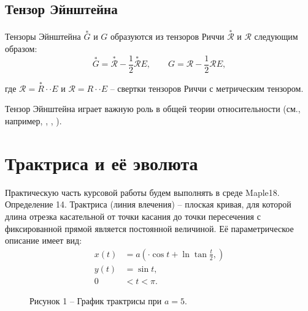 \documentclass[14pt,a4paper]{extarticle}
\begin{document}
\subsection{Тензор Эйнштейна}
Тензоры Эйнштейна $\overset{*}{G}$ и $G$ образуются из тензоров Риччи $\overset{*}{\mathcal{R}}$ и $\mathcal{R}$ следующим образом:
\begin{equation}\label{eq39}
	\overset{*}{G} = \overset{*}{\mathcal{R}} - \frac{1}{2}\overset{*}{\mathcal{R}}E, \qquad G = \mathcal{R} - \frac{1}{2}\mathcal{R}E,
\end{equation}

где $\mathcal{R} = \overset{*}{R} \cdot \cdot E$ и $\mathcal{R} = R \cdot \cdot E$ -- свертки тензоров Риччи с метрическим тензором.

Тензор Эйнштейна играет важную роль в общей теории относительности (см., например, \cite{Petrov}, \cite{Rashevskiy}, \cite{Shipov}).



\newpage
\section{Трактриса и её эволюта}
Практическую часть курсовой работы будем выполнять в среде Maple18.\\
Определение 14. Трактриса (линия влечения) -- плоская кривая, для которой длина отрезка касательной от точки касания до точки пересечения с фиксированной прямой является постоянной величиной. Её параметрическое описание имеет вид:
\begin{align}
	x(t) &= a (\cdot \cos{t} + \ln{\tan{\frac{t}{2}}},\label{eq40})\\
	y(t) &= \sin{t},\label{eq41}\\
	0 &< t < \pi.\label{eq42}
\end{align}

\begin{figure}[h]
	\caption*{Рисунок 1 -- График трактрисы при $a=5$.}
	\label{ris:plot1}
\end{figure}
\end{document}
